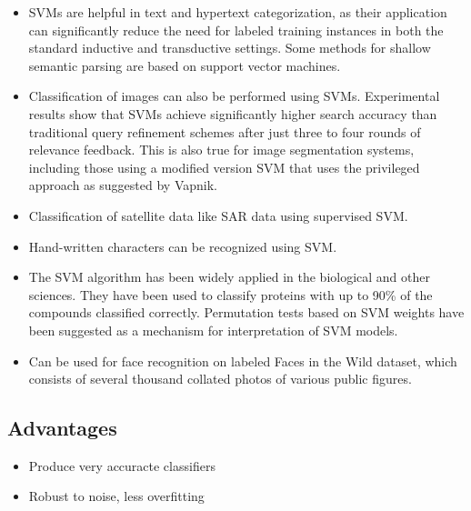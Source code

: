 \documentclass[11pt]{article}
\providecommand{\tightlist}{%
      \setlength{\itemsep}{0pt}\setlength{\parskip}{0pt}}
\begin{document}
\begin{itemize}
\tightlist
\item
  SVMs are helpful in text and hypertext categorization, as their
  application can significantly reduce the need for labeled training
  instances in both the standard inductive and transductive settings.
  Some methods for shallow semantic parsing are based on support vector
  machines.
\item
  Classification of images can also be performed using SVMs.
  Experimental results show that SVMs achieve significantly higher
  search accuracy than traditional query refinement schemes after just
  three to four rounds of relevance feedback. This is also true for
  image segmentation systems, including those using a modified version
  SVM that uses the privileged approach as suggested by Vapnik.
\item
  Classification of satellite data like SAR data using supervised SVM.
\item
  Hand-written characters can be recognized using SVM.
\item
  The SVM algorithm has been widely applied in the biological and other
  sciences. They have been used to classify proteins with up to 90\% of
  the compounds classified correctly. Permutation tests based on SVM
  weights have been suggested as a mechanism for interpretation of SVM
  models.
\item
  Can be used for face recognition on labeled Faces in the Wild dataset,
  which consists of several thousand collated photos of various public
  figures.
\end{itemize}

\hypertarget{advantages}{%
\subsection{Advantages}\label{advantages}}

\begin{itemize}
\tightlist
\item
  Produce very accuracte classifiers
\item
  Robust to noise, less overfitting
\end{itemize}


    
    
    
\end{document}
